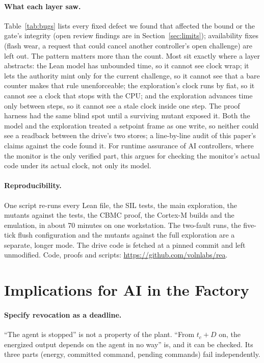 \documentclass[letterpaper]{article} %
\begin{document}
\paragraph{What each layer saw.} Table~\ref{tab:bugs} lists every fixed defect we found that affected
the bound or the gate's integrity (open review findings are in Section~\ref{sec:limits}); availability fixes (flash wear, a request that could cancel
another controller's open challenge) are left out. The pattern matters more than the count. Most sit exactly where a layer abstracts: the Lean model has
unbounded time, so it cannot see clock wrap; it lets the authority mint only for the current
challenge, so it cannot see that a bare counter makes that rule unenforceable; the exploration's
clock runs by fiat, so it cannot see a clock that stops with the CPU; and the exploration advances
time only between steps, so it cannot see a stale clock inside one step. The proof harness had
the same blind spot until a surviving mutant exposed it. Both the model and the exploration
treated a setpoint frame as one write, so neither could see a readback between the drive's two
stores; a line-by-line audit of this paper's claims against the code found it. For runtime assurance of AI controllers,
where the monitor is the only verified part, this argues for checking the monitor's actual code
under its actual clock, not only its model.

\paragraph{Reproducibility.} One script re-runs every Lean file, the SIL tests, the main
exploration, the mutants against the tests, the CBMC proof, the Cortex-M builds and the emulation,
in about 70 minutes on one workstation. The two-fault runs, the five-tick flush configuration and
the mutants against the full exploration are a separate, longer mode. The drive code is fetched at a pinned commit and left unmodified. Code, proofs and scripts: \url{https://github.com/volnlabs/rea}.

\section{Implications for AI in the Factory}
\label{sec:implications}

\paragraph{Specify revocation as a deadline.} ``The agent is stopped'' is not a property of the
plant. ``From $t_c + D$ on, the energized output depends on the agent in no way'' is, and it can
be checked. Its three parts (energy, committed command, pending commands) fail independently.
\end{document}
